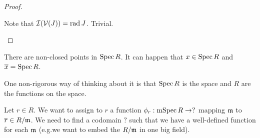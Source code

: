 \begin{proof}
  	\leavevmode
	\begin{enum}
		\io Note that $\mathcal{I}(\mathcal{V}(J)) = \operatorname{rad} J$.
		\io Trivial. \qedhere
	\end{enum}
\end{proof}

\begin{rmk}
	There are non-closed points in $\operatorname{Spec} R$.
	It can happen that $x \in \operatorname{Spec} R$ and $\overline{x} = \operatorname{Spec} R$.
\end{rmk}

One non-rigorous way of thinking about it is that $\operatorname{Spec} R$ is the space and $R$ are the functions on the space.

Let $r \in R$.
We want to assign to $r$ a function $\phi_r: \operatorname{mSpec} R \to ?$ mapping $\mathfrak{m}$ to $\overline{r} \in R/\mathfrak{m}$.
We need to find a codomain $?$ such that we have a well-defined function for each $\mathfrak{m}$ (e.g.\@ we want to embed the $R/\mathfrak{m}$ in one big field).
